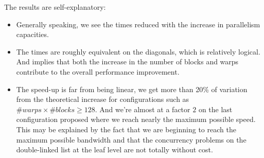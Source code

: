 The results are self-explanatory:
\begin{itemize}
    \item Generally speaking, we see the times reduced with the increase in parallelism capacities.
    \item The times are roughly equivalent on the diagonals, which is relatively logical. And implies that both the increase in the number of blocks and warps contribute to the overall performance improvement.
    \item The speed-up is far from being linear, we get more than 20\% of variation from the theoretical increase for configurations such as $\#warps \times \#blocks \geq 128$. And we're almost at a factor $2$ on the last configuration proposed where we reach nearly the maximum possible speed. This may be explained by the fact that we are beginning to reach the maximum possible bandwidth and that the concurrency problems on the double-linked list at the leaf level are not totally without cost.
\end{itemize}

